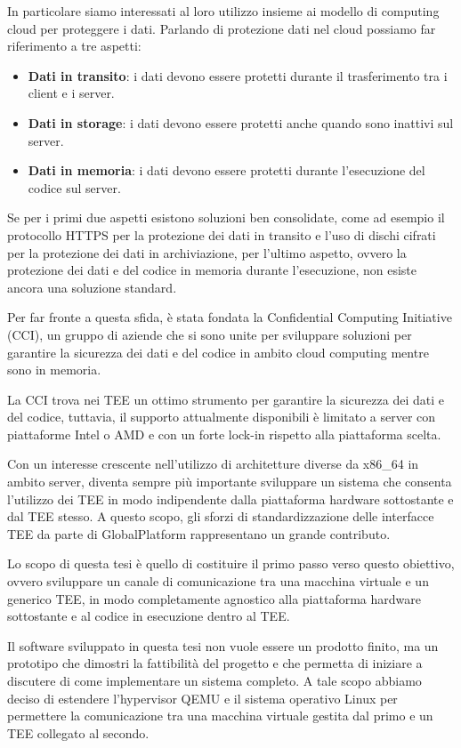 \documentclass[12pt,italian]{report}
\begin{document}
In particolare siamo interessati al loro utilizzo insieme ai modello di
computing cloud per proteggere i dati.
Parlando di protezione dati nel cloud possiamo far riferimento a tre
aspetti:
\begin{itemize}
    \item \textbf{Dati in transito}: i dati devono essere protetti durante
    il trasferimento tra i client e i server.
    \item \textbf{Dati in storage}: i dati devono essere protetti anche
    quando sono inattivi sul server.
    \item \textbf{Dati in memoria}: i dati devono essere protetti durante
    l'esecuzione del codice sul server.
\end{itemize}

Se per i primi due aspetti esistono soluzioni ben consolidate, come ad
esempio il protocollo HTTPS per la protezione dei dati in transito e
l'uso di dischi cifrati per la protezione dei dati in archiviazione,
per l'ultimo aspetto, ovvero la protezione dei dati e del codice in
memoria durante l'esecuzione, non esiste ancora una soluzione standard.

Per far fronte a questa sfida, è stata fondata la
Confidential Computing Initiative (CCI), un gruppo di aziende che si sono
unite per sviluppare soluzioni per garantire
la sicurezza dei dati e del codice in ambito cloud computing
mentre sono in memoria.

La CCI trova nei TEE un ottimo strumento per garantire la sicurezza dei dati
e del codice, tuttavia, il supporto attualmente disponibili è
limitato a server con piattaforme Intel o AMD e con un forte lock-in rispetto
alla piattaforma scelta.

Con un interesse crescente nell'utilizzo di architetture diverse da x86\_64
in ambito server, diventa sempre più importante sviluppare un sistema che
consenta l'utilizzo dei TEE in modo indipendente dalla piattaforma
hardware sottostante e dal TEE stesso.
A questo scopo, gli sforzi di standardizzazione delle interfacce TEE da
parte di GlobalPlatform rappresentano un grande contributo.

\bigbreak \noindent

Lo scopo di questa tesi è quello di costituire il primo passo verso questo
obiettivo, ovvero sviluppare un canale di comunicazione tra una macchina
virtuale e un generico TEE, in modo completamente agnostico alla piattaforma
hardware sottostante e al codice in esecuzione dentro al TEE.

Il software sviluppato in questa tesi non vuole essere un prodotto finito,
ma un prototipo che dimostri la fattibilità del progetto e che permetta
di iniziare a discutere di come implementare un sistema completo.
A tale scopo abbiamo deciso di estendere l'hypervisor QEMU e il sistema
operativo Linux per permettere la comunicazione tra una macchina virtuale
gestita dal primo e un TEE collegato al secondo.
\end{document}
